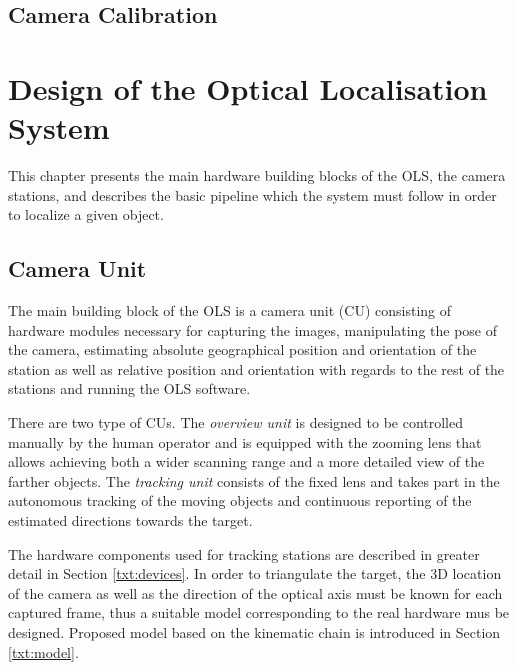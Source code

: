 \section{Camera Calibration}


\chapter{Design of the Optical Localisation System} \label{txt:system_overview}

This chapter presents the main hardware building blocks of the OLS, the camera stations, and describes the basic pipeline which the system must follow in order to localize a given object. 

\section{Camera Unit} \label{txt:camera_unit}

The main building block of the OLS is a camera unit (CU) consisting of hardware modules necessary for capturing the images, manipulating the pose of the camera, estimating absolute geographical position and orientation of the station as well as relative position and orientation with regards to the rest of the stations and running the OLS software.

There are two type of CUs. The \textit{overview unit} is designed to be controlled manually by the human operator and is equipped with the zooming lens that allows achieving both a wider scanning range and a more detailed view of the farther objects. The \textit{tracking unit} consists of the fixed lens and takes part in the autonomous tracking of the moving objects and continuous reporting of the estimated directions towards the target.

The hardware components used for tracking stations are described in greater detail in Section \ref{txt:devices}. In order to triangulate the target, the 3D location of the camera as well as the direction of the optical axis must be known for each captured frame, thus a suitable model corresponding to the real hardware mus be designed. Proposed model based on the kinematic chain is introduced in Section \ref{txt:model}.

